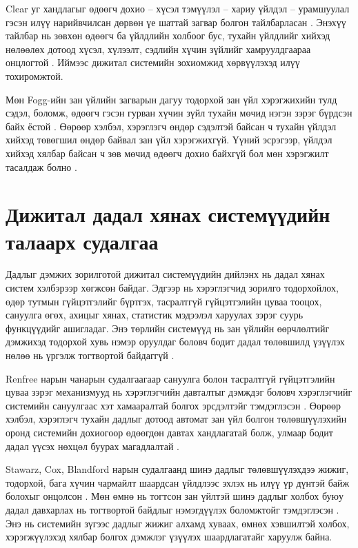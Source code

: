 Clear уг хандлагыг өдөөгч дохио -- хүсэл тэмүүлэл -- хариу үйлдэл -- урамшуулал гэсэн илүү нарийвчилсан дөрвөн үе шаттай загвар болгон тайлбарласан \cite{ref3}. Энэхүү тайлбар нь зөвхөн өдөөгч ба үйлдлийн холбоог бус, тухайн үйлдлийг хийхэд нөлөөлөх дотоод хүсэл, хүлээлт, сэдлийн хүчин зүйлийг хамруулдгаараа онцлогтой \cite{ref3}. Иймээс дижитал системийн зохиомжид хөрвүүлэхэд илүү тохиромжтой.

Мөн Fogg-ийн зан үйлийн загварын дагуу тодорхой зан үйл хэрэгжихийн тулд сэдэл, боломж, өдөөгч гэсэн гурван хүчин зүйл тухайн мөчид нэгэн зэрэг бүрдсэн байх ёстой \cite{ref4}. Өөрөөр хэлбэл, хэрэглэгч өндөр сэдэлтэй байсан ч тухайн үйлдэл хийхэд төвөгшил өндөр байвал зан үйл хэрэгжихгүй. Үүний эсрэгээр, үйлдэл хийхэд хялбар байсан ч зөв мөчид өдөөгч дохио байхгүй бол мөн хэрэгжилт тасалдаж болно \cite{ref4}.

\section{Дижитал дадал хянах системүүдийн талаарх судалгаа}

Дадлыг дэмжих зорилготой дижитал системүүдийн дийлэнх нь дадал хянах систем хэлбэрээр хөгжсөн байдаг. Эдгээр нь хэрэглэгчид зорилго тодорхойлох, өдөр тутмын гүйцэтгэлийг бүртгэх, тасралтгүй гүйцэтгэлийн цуваа тооцох, сануулга өгөх, ахицыг хянах, статистик мэдээлэл харуулах зэрэг суурь функцүүдийг ашигладаг. Энэ төрлийн системүүд нь зан үйлийн өөрчлөлтийг дэмжихэд тодорхой хувь нэмэр оруулдаг боловч бодит дадал төлөвшилд үзүүлэх нөлөө нь үргэлж тогтвортой байдаггүй \cite{ref5}.

Renfree нарын чанарын судалгаагаар сануулга болон тасралтгүй гүйцэтгэлийн цуваа зэрэг механизмууд нь хэрэглэгчийн давталтыг дэмждэг боловч хэрэглэгчийг системийн сануулгаас хэт хамааралтай болгох эрсдэлтэйг тэмдэглэсэн \cite{ref5}. Өөрөөр хэлбэл, хэрэглэгч тухайн дадлыг дотоод автомат зан үйл болгон төлөвшүүлэхийн оронд системийн дохиогоор өдөөгдөн давтах хандлагатай болж, улмаар бодит дадал үүсэх нөхцөл буурах магадлалтай \cite{ref5}.

Stawarz, Cox, Blandford нарын судалгаанд шинэ дадлыг төлөвшүүлэхдээ жижиг, тодорхой, бага хүчин чармайлт шаардсан үйлдлээс эхлэх нь илүү үр дүнтэй байж болохыг онцолсон \cite{ref11}. Мөн өмнө нь тогтсон зан үйлтэй шинэ дадлыг холбох буюу дадал давхарлах нь тогтвортой байдлыг нэмэгдүүлэх боломжтойг тэмдэглэсэн \cite{ref11}. Энэ нь системийн зүгээс дадлыг жижиг алхамд хуваах, өмнөх хэвшилтэй холбох, хэрэгжүүлэхэд хялбар болгох дэмжлэг үзүүлэх шаардлагатайг харуулж байна.

